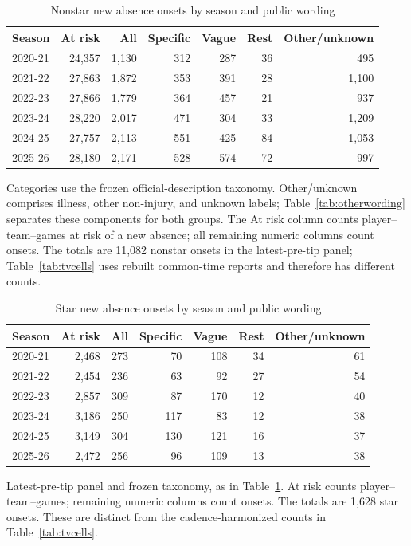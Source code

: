 \documentclass[11pt]{article}
\begin{document}
\begin{table}[!htbp]\centering\caption{Nonstar new absence onsets by season and public wording}\label{tab:nonstar}\footnotesize
\begin{tabular}{@{}lrrrrrr@{}}\toprule
Season & At risk & All & Specific & Vague & Rest & Other/unknown\\\midrule
2020-21 & 24,357 & 1,130 & 312 & 287 & 36 & 495 \\
2021-22 & 27,863 & 1,872 & 353 & 391 & 28 & 1,100 \\
2022-23 & 27,866 & 1,779 & 364 & 457 & 21 & 937 \\
2023-24 & 28,220 & 2,017 & 471 & 304 & 33 & 1,209 \\
2024-25 & 27,757 & 2,113 & 551 & 425 & 84 & 1,053 \\
2025-26 & 28,180 & 2,171 & 528 & 574 & 72 & 997 \\\bottomrule\end{tabular}\par\smallskip\raggedright\footnotesize Categories use the frozen official-description taxonomy. Other/unknown comprises illness, other non-injury, and unknown labels; Table~\ref{tab:otherwording} separates these components for both groups. The At risk column counts player--team--games at risk of a new absence; all remaining numeric columns count onsets. The totals are 11,082 nonstar onsets in the latest-pre-tip panel; Table~\ref{tab:tvcells} uses rebuilt common-time reports and therefore has different counts.
\end{table}



\begin{table}[!htbp]\centering\caption{Star new absence onsets by season and public wording}\label{tab:starwording}\footnotesize
\begin{tabular}{@{}lrrrrrr@{}}\toprule
Season & At risk & All & Specific & Vague & Rest & Other/unknown\\\midrule
2020-21 & 2,468 & 273 & 70 & 108 & 34 & 61\\
2021-22 & 2,454 & 236 & 63 & 92 & 27 & 54\\
2022-23 & 2,857 & 309 & 87 & 170 & 12 & 40\\
2023-24 & 3,186 & 250 & 117 & 83 & 12 & 38\\
2024-25 & 3,149 & 304 & 130 & 121 & 16 & 37\\
2025-26 & 2,472 & 256 & 96 & 109 & 13 & 38\\\bottomrule\end{tabular}\par\smallskip\raggedright\footnotesize Latest-pre-tip panel and frozen taxonomy, as in Table~\ref{tab:nonstar}. At risk counts player--team--games; remaining numeric columns count onsets. The totals are 1,628 star onsets. These are distinct from the cadence-harmonized counts in Table~\ref{tab:tvcells}.
\end{table}
\end{document}
